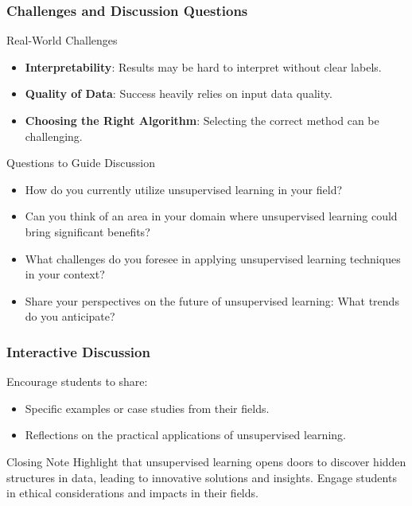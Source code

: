 \documentclass[aspectratio=169]{beamer}
\begin{document}
\begin{frame}[fragile]
    \frametitle{Challenges and Discussion Questions}
    \begin{block}{Real-World Challenges}
        \begin{itemize}
            \item \textbf{Interpretability}: Results may be hard to interpret without clear labels.
            \item \textbf{Quality of Data}: Success heavily relies on input data quality.
            \item \textbf{Choosing the Right Algorithm}: Selecting the correct method can be challenging.
        \end{itemize}
    \end{block}

    \begin{block}{Questions to Guide Discussion}
        \begin{itemize}
            \item How do you currently utilize unsupervised learning in your field?
            \item Can you think of an area in your domain where unsupervised learning could bring significant benefits?
            \item What challenges do you foresee in applying unsupervised learning techniques in your context?
            \item Share your perspectives on the future of unsupervised learning: What trends do you anticipate?
        \end{itemize}
    \end{block}
\end{frame}

\begin{frame}[fragile]
    \frametitle{Interactive Discussion}
    Encourage students to share:
    \begin{itemize}
        \item Specific examples or case studies from their fields.
        \item Reflections on the practical applications of unsupervised learning.
    \end{itemize}
    
    \begin{block}{Closing Note}
        Highlight that unsupervised learning opens doors to discover hidden structures in data, leading to innovative solutions and insights. Engage students in ethical considerations and impacts in their fields.
    \end{block}
\end{frame}
\end{document}

